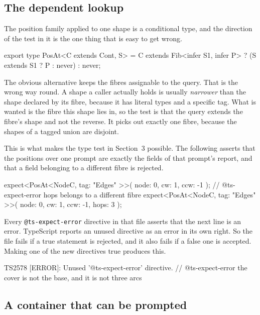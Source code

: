 \documentclass[11pt,a4paper]{article}
\begin{document}
\subsection{The dependent lookup}

The position family applied to one shape is a conditional type, and the direction of
the test in it is the one thing that is easy to get wrong.

\begin{code}
export type PosAt<C extends Cont, S> =
  C extends Fib<infer S1, infer P> ? (S extends S1 ? P : never) : never;
\end{code}

The obvious alternative keeps the fibres assignable to the query. That is the wrong
way round. A shape a caller actually holds is usually \emph{narrower} than the shape
declared by its fibre, because it has literal types and a specific tag. What is
wanted is the fibre this shape lies in, so the test is that the query extends the
fibre's shape and not the reverse. It picks out exactly one fibre, because the shapes
of a tagged union are disjoint.

This is what makes the type test in Section~3 possible. The following asserts that
the positions over one prompt are exactly the fields of that prompt's report, and
that a field belonging to a different fibre is rejected.

\begin{code}
expect<PosAt<NodeC, { tag: "Edges" }>>({ node: 0, cw: 1, ccw: -1 });
// @ts-expect-error  hops belongs to a different fibre
expect<PosAt<NodeC, { tag: "Edges" }>>({ node: 0, cw: 1, ccw: -1, hops: 3 });
\end{code}

Every \verb|@ts-expect-error| directive in that file asserts that the next line is an
error. TypeScript reports an unused directive as an error in its own right. So the
file fails if a true statement is rejected, and it also fails if a false one is
accepted. Making one of the new directives true produces this.

\begin{term}
TS2578 [ERROR]: Unused '@ts-expect-error' directive.
// @ts-expect-error  the cover is not the base, and it is not three arcs
\end{term}

\subsection{A container that can be prompted}
\end{document}
